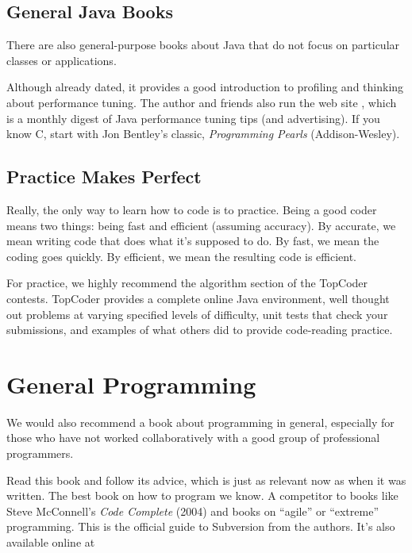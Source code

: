 \subsection{General Java Books}

There are also general-purpose books about Java that do
not focus on particular classes or applications.
%
\begin{itemize}
%
{Although already dated, it provides a good introduction to
  profiling and thinking about performance tuning.  The author and friends
  also run the web site , which is a
  monthly digest of Java performance tuning tips (and advertising).
  If you know C, start with Jon Bentley's classic, {\it Programming
  Pearls} (Addison-Wesley).}
%
\end{itemize}


\subsection{Practice Makes Perfect}

\noindent
Really, the only way to learn how to code is to practice.  Being a
good coder means two things: being fast and efficient (assuming
accuracy).  By accurate, we mean writing code that does what it's
supposed to do.  By fast, we mean the coding goes quickly.  By efficient,
we mean the resulting code is efficient.

For practice, we highly recommend the algorithm section of the
TopCoder contests.  TopCoder provides a complete online Java
environment, well thought out problems at varying specified levels of
difficulty, unit tests that check your submissions, and examples of
what others did to provide code-reading practice.
%
\begin{quote}
\end{quote}
%



\section{General Programming}

\noindent
We would also recommend a book about programming in general, 
especially for those who have not worked collaboratively with
a good group of professional programmers.
%
\begin{itemize}
{Read this book and follow its advice, which is just as relevant now
as when it was written.  The best book on how to program
we know.  A competitor to books like Steve McConnell's {\it Code Complete} (2004)
and books on ``agile'' or ``extreme'' programming.}
%
{This is the official guide to Subversion from the
authors.  It's also available online at
%
}
\end{itemize}

